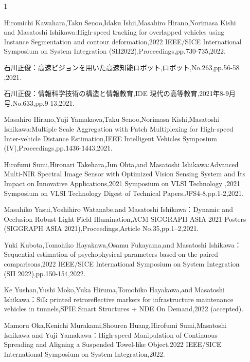 \begin{査読付}{1}


Hiromichi Kawahara,Taku Senoo,Idaku Ishii,Masahiro Hirano,Norimasa Kishi and Masatoshi Ishikawa:High-speed tracking for overlapped vehicles using Instance Segmentation and contour deformation,2022 IEEE/SICE International Symposium on System Integration (SII2022),Proceedings,pp.730-735,2022.


石川正俊：高速ビジョンを用いた高速知能ロボット,ロボット,No.263,pp.56-58 ,2021.

石川正俊：情報科学技術の構造と情報教育,IDE 現代の高等教育,2021年8-9月号,No.633,pp.9-13,2021.

Masahiro Hirano,Yuji Yamakawa,Taku Senoo,Norimasa Kishi,Masatoshi Ishikawa:Multiple Scale Aggregation with Patch Multiplexing for High-speed Inter-vehicle Distance Estimation,IEEE Intelligent Vehicles Symposium (IV),Proceedings,pp.1436-1443,2021.

Hirofumi Sumi,Hironari Takehara,Jun Ohta,and Masatoshi Ishikawa:Advanced Multi-NIR Spectral Image Sensor with Optimized Vision Sensing System and Its Impact on Innovative Applications,2021 Symposium on VLSI Technology ,2021 Symposium on VLSI Technology Digest of Technical Papers,JFS4-8,pp.1-2,2021.

Masahiko Yasui,Yoshihiro Watanabe,and Masatoshi Ishikawa：Dynamic and Occlusion-Robust Light Field Illumination,ACM SIGGRAPH ASIA 2021 Posters (SIGGRAPH ASIA 2021),Proceedings,Article No.35,pp.1–2,2021.

Yuki Kubota,Tomohiko Hayakawa,Osamu Fukayama,and Masatoshi Ishikawa：Sequential estimation of psychophysical parameters based on the paired comparisons,2022 IEEE/SICE International Symposium on System Integration (SII 2022),pp.150-154,2022.

Ke Yushan,Yushi Moko,Yuka Hiruma,Tomohiko Hayakawa,and Masatoshi Ishikawa：Silk printed retroreflective markers for infrastructure maintenance vehicles in tunnels,SPIE Smart Structures + NDE On Demand,2022 (accepted).

Mamoru Oka,Kenichi Murakami,Shouren Huang,Hirofumi Sumi,Masatoshi Ishikawa and Yuji Yamakawa：High-speed Manipulation of Continuous Spreading and Aligning a Suspended Towel-like Object,2022 IEEE/SICE International Symposium on System Integration,2022.


\end{査読付}
